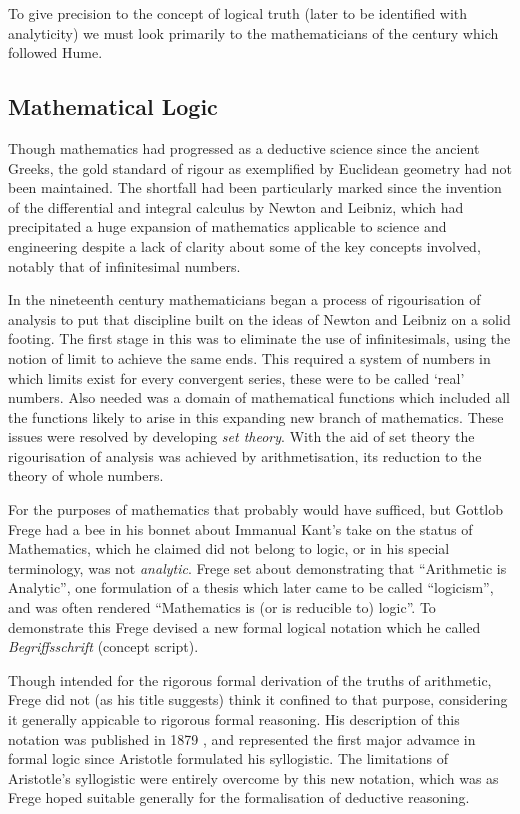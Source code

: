 \documentclass[10pt,titlepage]{article}
\begin{document}
To give precision to the concept of logical truth (later to be identified with analyticity)  we must look primarily to the mathematicians of the century which followed Hume.

\subsection{Mathematical Logic}

Though mathematics had progressed as a deductive science since the ancient Greeks, the gold standard of rigour as exemplified by Euclidean geometry had not been maintained.
The shortfall had been particularly marked since the invention of the differential and integral calculus by Newton and Leibniz, which had precipitated a huge expansion of mathematics applicable to science and engineering despite a lack of clarity about some of the key concepts involved, notably that of infinitesimal numbers.

In the nineteenth century mathematicians began a process of rigourisation of analysis to put that discipline built on the ideas of Newton and Leibniz on a solid footing.
The first stage in this was to eliminate the use of infinitesimals, using the notion of limit to achieve the same ends.
This required a system of numbers in which limits exist for every convergent series, these were to be called `real' numbers.
Also needed was a domain of mathematical functions which included all the functions likely to arise in this expanding new branch of mathematics.
These issues were resolved by developing \emph{set theory}.
With the aid of set theory the rigourisation of analysis was achieved by arithmetisation, its reduction to the theory of whole numbers.

For the purposes of mathematics that probably would have sufficed, but Gottlob Frege had a bee in his bonnet about Immanual Kant's take on the status of Mathematics, which he claimed did not belong to logic, or in his special terminology, was not \emph{analytic}.
Frege set about demonstrating that ``Arithmetic is Analytic'', one formulation of a thesis which later came to be called ``logicism'', and was often rendered ``Mathematics is (or is reducible to) logic''.
To demonstrate this Frege devised a new formal logical notation which he called \emph{Begriffsschrift} (concept script).

Though intended for the rigorous formal derivation of the truths of arithmetic, Frege did not (as his title suggests) think it confined to that purpose, considering it generally appicable to rigorous formal reasoning.
His description of this notation was published in 1879 \cite{frege1879}, and represented the first major advamce in formal logic since Aristotle formulated his syllogistic.
The limitations of Aristotle's syllogistic were entirely overcome by this new notation, which was as Frege hoped suitable generally for the formalisation of deductive reasoning.
\end{document}
